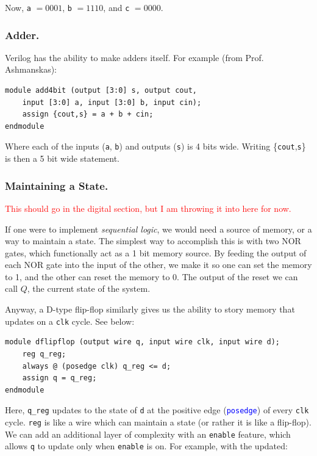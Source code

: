 Now, \texttt{a} $= 0001$, \texttt{b} $= 1110$, and \texttt{c} $= 0000$. 


\subsubsection{Adder.}

Verilog has the ability to make adders itself. For example (from Prof. Ashmanskas): 

\bs 
\begin{lstlisting}
module add4bit (output [3:0] s, output cout,
    input [3:0] a, input [3:0] b, input cin);
    assign {cout,s} = a + b + cin;
endmodule
\end{lstlisting}
\bs

Where each of the inputs (\texttt{a}, \texttt{b}) and outputs (\texttt{s}) is 4 bits wide. Writing \{\texttt{cout},\texttt{s}\} is then a 5 bit wide statement. 


\subsubsection{Maintaining a State.}

\textcolor{red}{This should go in the digital section, but I am throwing it into here for now.}\newline

If one were to implement \textit{sequential logic}, we would need a source of memory, or a way to maintain a state. The simplest way to accomplish this is with two NOR gates, which functionally act as a 1 bit memory source. By feeding the output of each NOR gate into the input of the other, we make it so one can set the memory to 1, and the other can reset the memory to 0. The output of the reset we can call $Q$, the current state of the system.\newline

Anyway, a D-type flip-flop similarly gives us the ability to story memory that updates on a \texttt{clk} cycle. See below:

\bs 
\begin{lstlisting}
module dflipflop (output wire q, input wire clk, input wire d);
    reg q_reg;
    always @ (posedge clk) q_reg <= d;
    assign q = q_reg;
endmodule
\end{lstlisting}
\bs

Here, \texttt{q\_reg} updates to the state of \texttt{d} at the positive edge (\textcolor{blue}{\texttt{posedge}}) of every \texttt{clk} cycle. \texttt{reg} is like a wire which can maintain a state (or rather it is like a flip-flop). We can add an additional layer of complexity with an \texttt{enable} feature, which allows \texttt{q} to update only when \texttt{enable} is on. For example, with the updated: 

